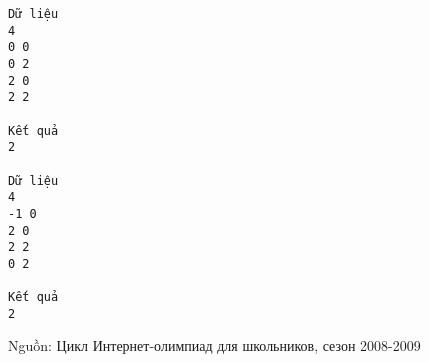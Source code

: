 \begin{verbatim}
Dữ liệu
4
0 0
0 2
2 0
2 2

Kết quả
2

Dữ liệu
4
-1 0
2 0
2 2
0 2

Kết quả
2
\end{verbatim}

   Nguồn: Цикл Интернет-олимпиад для школьников, сезон 2008-2009